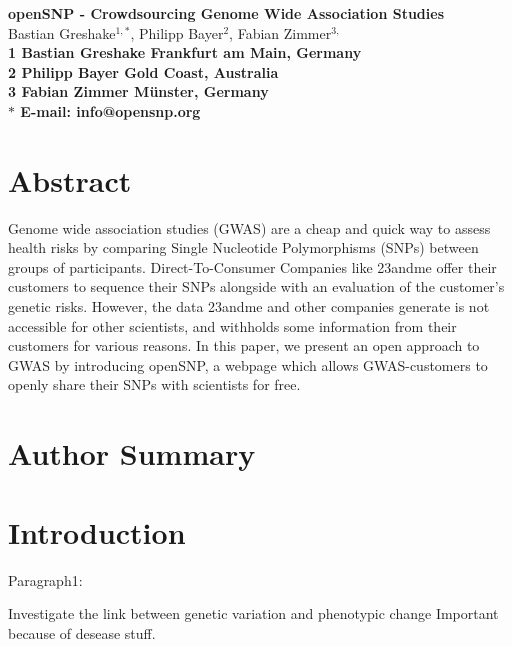\documentclass[10pt]{article}
\date{}
\begin{document}
\begin{flushleft}
{\Large
\textbf{openSNP - Crowdsourcing Genome Wide Association Studies}
}
\\
Bastian Greshake$^{1,\ast}$, 
Philipp Bayer$^{2}$, 
Fabian Zimmer$^{3,}$
\\
\bf{1} Bastian Greshake Frankfurt am Main, Germany
\\
\bf{2} Philipp Bayer Gold Coast, Australia
\\
\bf{3} Fabian Zimmer M\"unster, Germany
\\
$\ast$ E-mail: info@opensnp.org
\end{flushleft}

\section*{Abstract}
Genome wide association studies (GWAS) are a cheap and quick way to assess health risks by comparing Single Nucleotide Polymorphisms (SNPs) between groups of participants. Direct-To-Consumer Companies like 23andme offer their customers to sequence their SNPs alongside with an evaluation of the customer's genetic risks. However, the data 23andme and other companies generate is not accessible for other scientists, and withholds some information from their customers for various reasons. In this paper, we present an open approach to GWAS by introducing openSNP, a webpage which allows GWAS-customers to openly share their SNPs with scientists for free.  %


\section*{Author Summary}

\section*{Introduction}



Paragraph1:


Investigate the link between genetic variation and phenotypic change
Important because of desease stuff.
\end{document}
